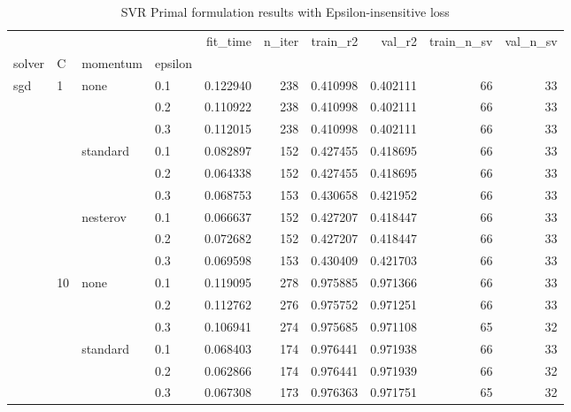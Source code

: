 \begin{table}[H]
\centering
\caption{SVR Primal formulation results with Epsilon-insensitive loss}
\label{primal_svr_eps_cv_results}
\begin{tabular}{llllrrrrrr}
\toprule
          &     &   &     &  fit\_time &  n\_iter &  train\_r2 &    val\_r2 &  train\_n\_sv &  val\_n\_sv \\
solver & C & momentum & epsilon &           &         &           &           &             &           \\
\midrule
sgd & 1   & none & 0.1 &  0.122940 &     238 &  0.410998 &  0.402111 &          66 &        33 \\
          &     &   & 0.2 &  0.110922 &     238 &  0.410998 &  0.402111 &          66 &        33 \\
          &     &   & 0.3 &  0.112015 &     238 &  0.410998 &  0.402111 &          66 &        33 \\
          &     & standard & 0.1 &  0.082897 &     152 &  0.427455 &  0.418695 &          66 &        33 \\
          &     &   & 0.2 &  0.064338 &     152 &  0.427455 &  0.418695 &          66 &        33 \\
          &     &   & 0.3 &  0.068753 &     153 &  0.430658 &  0.421952 &          66 &        33 \\
          &     & nesterov & 0.1 &  0.066637 &     152 &  0.427207 &  0.418447 &          66 &        33 \\
          &     &   & 0.2 &  0.072682 &     152 &  0.427207 &  0.418447 &          66 &        33 \\
          &     &   & 0.3 &  0.069598 &     153 &  0.430409 &  0.421703 &          66 &        33 \\
          & 10  & none & 0.1 &  0.119095 &     278 &  0.975885 &  0.971366 &          66 &        33 \\
          &     &   & 0.2 &  0.112762 &     276 &  0.975752 &  0.971251 &          66 &        33 \\
          &     &   & 0.3 &  0.106941 &     274 &  0.975685 &  0.971108 &          65 &        32 \\
          &     & standard & 0.1 &  0.068403 &     174 &  0.976441 &  0.971938 &          66 &        33 \\
          &     &   & 0.2 &  0.062866 &     174 &  0.976441 &  0.971939 &          66 &        32 \\
          &     &   & 0.3 &  0.067308 &     173 &  0.976363 &  0.971751 &          65 &        32 \\

\end{tabular}
\end{table}
